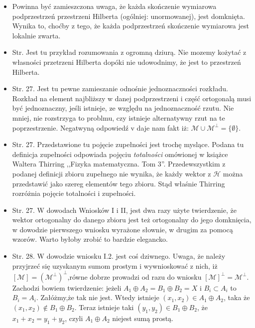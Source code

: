 \documentclass[a4paper,11pt]{article}
\begin{document}
\begin{itemize}
\item Powinna być zamieszczona uwaga, że każda skończenie wymiarowa
  podprzestrzeń przestrzeni Hilberta (ogólniej: unormowanej), jest
  domknięta. Wynika to, choćby z tego, że każda podprzestrzeń
  skończenie wymiarowa jest lokalnie zwarta.
\item Str. Jest tu przykład rozumowania z ogromną dziurą. Nie mozemy
  kożytać z własności przetrzeni Hilberta dopóki nie udowodnimy, że
  jest to przestrzeń Hilberta.
\item Str. 27. Jest tu pewne zamieszanie odnośnie jednoznaczności
  rozkładu. Rozkład na element najbliższy w danej podprzestrzeni i
  część ortogonalą musi być jednoznaczny, jeśli istnieje, ze względu
  na jednoznaczność rzutu. Nie mniej, nie rozstrzyga to problmu, czy
  istnieje alternatywny rzut na te poprzestrzenie. Negatwyną odpowiedź
  v daje nam fakt iż:
  $\mathcal{ M } \cup \mathcal{ M }^{ \bot } = \{ \emptyset \}$.
\item Str. 27. Przedstawione tu pojęcie zupełności jest trochę
  myslące. Podana tu definicja zupełności odpowiada pojęciu
  \emph{totalności} omówionej w książce Waltera Thirring ,,Fizyka
  matematyczna. Tom 3''. Przedewszystkim z podanej definicji zbioru
  zupełnego nie wynika, że każdy wektor z $\mathcal{ H }$ można
  przedstawić jako szereg elementów tego zbioru. Stąd właśnie Thirring
  rozróżnia pojęcie totalności i zupełności.
\item Str. 27. W dowodach Wniosków I i II, jest dwa razy użyte
  twierdzenie, że wektor ortogonalny do danego zbioru jest też
  ortogonalny do jego domknięcia, w dowodzie pierwszego wniosku
  wyrażone słownie, w drugim za pomocą wzorów. Warto byłoby zrobić to
  bardzie elegancko.
\item Str. 28. W dowodzie wniosku I.2. jest coś dziwnego. Uwaga, że
  należy przyjrzeć się uzyskanym sumom prostym i wywnioskować z nich,
  iż $[ \mathcal{ M } ]=( \mathcal{ M }^{ \bot } )^{ \bot }$,równe
  dobrze prowadzi od razu do wniosku
  $[ \mathcal{ M } ]^{ \bot } = \mathcal{ M }^{ \bot }$.  Zachodzi
  bowiem twierdzenie: jeżeli
  $A_{ 1 } \oplus A_{ 2 } = B_{ 1 } \oplus B_{ 2 } = X$ i
  $B_{ i } \subset A_{ i }$ to $B_{ i } = A_{ i }$.  Załóżmy,że tak
  nie jest. Wtedy istnieje
  $( x_{ 1 }, x_{ 2 } ) \in A_{ 1 } \oplus A_{ 2 }$, taka że
  $( x_{ 1 }, x_{ 2 } ) \notin B_{ 1 } \oplus B_{ 2 }$.  Teraz
  istnieje taki $( y_{ 1 }, y_{ 2 } ) \in B_{ 1 } \oplus B_{ 2 }$, że
  $x_{ 1 } + x_{ 2 } = y_{ 1 } + y_{ 2 }$, czyli
  $A_{ 1 } \oplus A_{ 2 }$ niejest sumą prostą.

\end{itemize}
\end{document}
